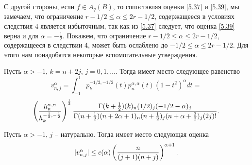 С другой стороны, если  $f\in A_q(B)$, то сопоставляя оценки \eqref{5.37} и \eqref{5.39}, мы замечаем, что ограничение $r-1/2\le \alpha\le 2r-1/2$, содержащееся в условиях следствия 4 является избыточным, так как из \eqref{5.37} следует, что оценка \eqref{5.39} верна и для $\alpha=-\frac12$. Покажем, что ограничение $r-1/2\le \alpha\le 2r-1/2$, содержащееся  в следствии 4, может быть ослаблено до $-1/2\le \alpha\le 2r-1/2$. Для этого нам понадобятся некоторые вспомогательные утверждения.

\begin{lemma} Пусть $\alpha>-1$, $k=n+2j$, $j=0,1,\ldots$. Тогда имеет место следующее равенство
$$
v_{n,j}^\alpha=\int_{-1}^1p_k^{-1/2,-1/2}(t)p_n^{\alpha,\alpha}(t)(1-t^2)^\alpha dt=
$$
\begin{equation}\label{5.40}
\left(\frac{h_n^{\alpha,\alpha}}{h_k^{-\frac12,-\frac12}}\right)^\frac12
 {\Gamma(k+\frac12)(k)_n(1/2)_j(-1/2-\alpha)_j\over\Gamma(n+\frac12)(n+2\alpha+1)_n
(n+\frac12)_j(n+\alpha+\frac32)_j(2j)!}.
  \end{equation}
\end{lemma}
%

\begin{lemma} Пусть $\alpha>-1$, $j$ -- натурально. Тогда имеет место следующая оценка
$$
|v_{n,j}^\alpha|\le c(\alpha)\left({n\over (j+1)(n+j)}\right)^{\alpha+1}.$$
\end{lemma}

